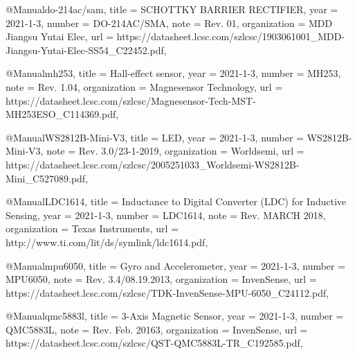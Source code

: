 @Manual{do-214ac/sam,
    title        = {SCHOTTKY BARRIER RECTIFIER},
    year         = {2021-1-3},
    number       = {DO-214AC/SMA},
    note         = {Rev. 01},
    organization = {MDD Jiangsu Yutai Elec},
    url          = {https://datasheet.lcsc.com/szlcsc/1903061001_MDD-Jiangsu-Yutai-Elec-SS54_C22452.pdf},
}   

@Manual{mh253,
    title        = {Hall-effect sensor},
    year         = {2021-1-3},
    number       = {MH253},
    note         = {Rev. 1.04},
    organization = {Magnesensor Technology},
    url          = {https://datasheet.lcsc.com/szlcsc/Magnesensor-Tech-MST-MH253ESO_C114369.pdf},
}  

@Manual{WS2812B-Mini-V3,
    title        = {LED},
    year         = {2021-1-3},
    number       = {WS2812B-Mini-V3},
    note         = {Rev. 3.0/23-1-2019},
    organization = {Worldsemi},
    url          = {https://datasheet.lcsc.com/szlcsc/2005251033_Worldsemi-WS2812B-Mini_C527089.pdf},
}

@Manual{LDC1614,
    title        = {Inductance to Digital Converter (LDC) for Inductive Sensing},
    year         = {2021-1-3},
    number       = {LDC1614},
    note         = {Rev. MARCH 2018},
    organization = {Texas Instruments},
    url          = {http://www.ti.com/lit/ds/symlink/ldc1614.pdf},
}

@Manual{mpu6050,
    title        = {Gyro and Accelerometer},
    year         = {2021-1-3},
    number       = {MPU6050},
    note         = {Rev. 3.4/08.19.2013},
    organization = {InvenSense},
    url          = {https://datasheet.lcsc.com/szlcsc/TDK-InvenSense-MPU-6050_C24112.pdf},
}

@Manual{qmc5883l,
    title        = {3-Axis Magnetic Sensor},
    year         = {2021-1-3},
    number       = {QMC5883L},
    note         = {Rev. Feb. 20163},
    organization = {InvenSense},
    url          = {https://datasheet.lcsc.com/szlcsc/QST-QMC5883L-TR_C192585.pdf},
}

